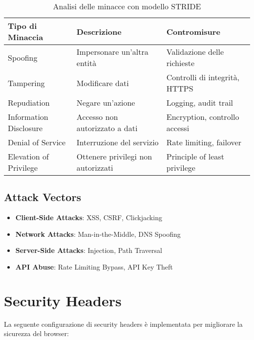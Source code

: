 \begin{table}[H]
\centering
\begin{tabular}{|l|l|l|}
\hline
\textbf{Tipo di Minaccia} & \textbf{Descrizione} & \textbf{Contromisure} \\
\hline
Spoofing & Impersonare un'altra entità & Validazione delle richieste \\
\hline
Tampering & Modificare dati & Controlli di integrità, HTTPS \\
\hline
Repudiation & Negare un'azione & Logging, audit trail \\
\hline
Information Disclosure & Accesso non autorizzato a dati & Encryption, controllo accessi \\
\hline
Denial of Service & Interruzione del servizio & Rate limiting, failover \\
\hline
Elevation of Privilege & Ottenere privilegi non autorizzati & Principle of least privilege \\
\hline
\end{tabular}
\caption{Analisi delle minacce con modello STRIDE}
\label{table:stride-threats}
\end{table}

\subsection{Attack Vectors}
\begin{itemize}
    \item \textbf{Client-Side Attacks}: XSS, CSRF, Clickjacking
    \item \textbf{Network Attacks}: Man-in-the-Middle, DNS Spoofing
    \item \textbf{Server-Side Attacks}: Injection, Path Traversal
    \item \textbf{API Abuse}: Rate Limiting Bypass, API Key Theft
\end{itemize}

\section{Security Headers}
La seguente configurazione di security headers è implementata per migliorare la sicurezza del browser:

